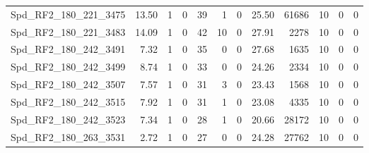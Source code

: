 \begin{longtable}[c]{@{}lrrrrrrrrrrr@{}}
Spd\_RF2\_180\_221\_3475     & 13.50                  & 1                       & 0                       & 39                     & 1                       & 0                       & 25.50                   & 61686                    & 10                       & 0                        & 0                        \\
Spd\_RF2\_180\_221\_3483     & 14.09                  & 1                       & 0                       & 42                     & 10                      & 0                       & 27.91                   & 2278                     & 10                       & 0                        & 0                        \\
Spd\_RF2\_180\_242\_3491     & 7.32                   & 1                       & 0                       & 35                     & 0                       & 0                       & 27.68                   & 1635                     & 10                       & 0                        & 0                        \\
Spd\_RF2\_180\_242\_3499     & 8.74                   & 1                       & 0                       & 33                     & 0                       & 0                       & 24.26                   & 2334                     & 10                       & 0                        & 0                        \\
Spd\_RF2\_180\_242\_3507     & 7.57                   & 1                       & 0                       & 31                     & 3                       & 0                       & 23.43                   & 1568                     & 10                       & 0                        & 0                        \\
Spd\_RF2\_180\_242\_3515     & 7.92                   & 1                       & 0                       & 31                     & 1                       & 0                       & 23.08                   & 4335                     & 10                       & 0                        & 0                        \\
Spd\_RF2\_180\_242\_3523     & 7.34                   & 1                       & 0                       & 28                     & 1                       & 0                       & 20.66                   & 28172                    & 10                       & 0                        & 0                        \\
Spd\_RF2\_180\_263\_3531     & 2.72                   & 1                       & 0                       & 27                     & 0                       & 0                       & 24.28                   & 27762                    & 10                       & 0                        & 0                        \\

\end{longtable}
